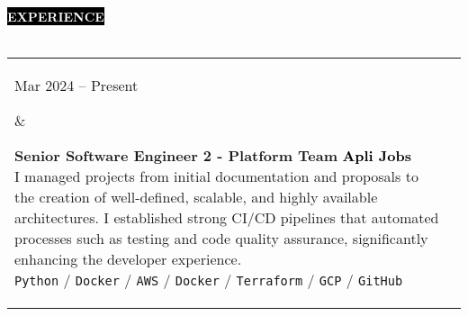 \documentclass[10pt,A4]{article}
\makeatletter
\newcounter{a}
\newcounter{b}
\newcounter{c}
\newcommand{\cvsection}[1] {
	\textcolor{white}{\MakeUppercase{\textbf{#1}}}
}
\newcommand{\cvsect}[1]{
	\colorbox{black}{{\cvsection{#1}}}\\\\%
}
\newenvironment{entrylist}{%
	\begin{tabular*}{\textwidth}[t]{@{\extracolsep{\fill}}ll}
	}{%
	\end{tabular*}
}
\newcommand{\entry}[4]{%
	\parbox[t]{3.5cm}{%
		#1%
	}%
	&\parbox[t]{14cm}{%
		\textbf{#2}%
		\hfill%
		{\footnotesize \textbf{\textcolor{black}{#3}}}\\%
		#4%
	}\\\\}
\newcommand{\slashsep}{
	\hspace{2mm}/\hspace{2mm}
}
\makeatother
\begin{document}
	\cvsect{Experience}
	\begin{entrylist}
		\entry
		{Mar 2024 – Present}
		{Senior Software Engineer 2 - Platform Team}
		{Apli Jobs} %
		{I managed projects from initial 
		documentation and proposals to the creation of well-defined, scalable, and 
		highly available architectures. I established strong CI/CD pipelines that 
		automated processes such as testing and code quality assurance, significantly 
		enhancing the developer experience.\\
			\texttt{Python}\slashsep\texttt{Docker}\slashsep\texttt{AWS}\slashsep\texttt{Docker}\slashsep\texttt{Terraform}\slashsep\texttt{GCP}\slashsep\texttt{GitHub}}
		\entry
		{Jan 2022 – Mar 2024}
		{Cloud Engineer AWS Specialist}
		{Apli Jobs} %
		{I've led pivotal projects in infrastructure
		migration and optimization, successfully migrating critical applications to AWS
		within Docker containers for a comprehensive cloud modernization initiative. I
		played a role in ensuring ISO 27001 certification compliance and presented
		cloud-related evidence, emphasizing security protocols.
		\hfil\break
		Leveraging DevOps, I orchestrated CI/CD pipelines using AWS Elastic Beanstalk and
		ECS upgrades. I achieved substantial cost savings, operational efficiency, network
		security enhancements, and scalability. These initiatives aligned our tech framework
		with business imperatives, fostering sustained growth and a competitive edge in the
		dynamic realm of cloud technology.\\
			\texttt{AWS}\slashsep\texttt{CI/CD}\slashsep\texttt{Python}\slashsep\texttt{Docker}\slashsep\texttt{Terraform}\slashsep\texttt{GCP}\slashsep\texttt{GitHub}}
		\entry
		{Feb 2021 – Jan 2022}
		{Backend Developer + AWS Cloud Engineer}
		{Galaxy Technology}
		{As a Backend Engineer and Team Lead, I crafted REST APIs and oversaw database
		management using Node.js with Express and Sequelize. My role extended to hosting
		essential services within AWS, employing tools like Lambda, API Gateway,
		AppSync, DynamoDB, SNS, and SQS. Collaborating closely with customers, I addressed
		change requests and implemented new functionalities, enhancing our services to
		meet evolving needs.\\
			\texttt{Node.js}\slashsep\texttt{Express}\slashsep\texttt{Sequelize}\slashsep\texttt{AWS}\slashsep\texttt{GraphQL}}
	\end{entrylist}
	\\\\
\end{document}
